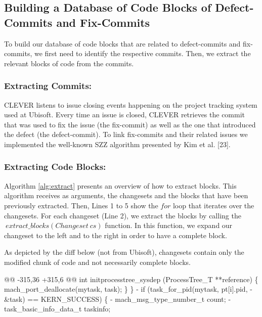\documentclass[sigconf]{acmart}
\newenvironment{Shaded}{}{}
\newcommand{\DataTypeTok}[1]{\textcolor[rgb]{0.56,0.13,0.00}{{#1}}}
\newcommand{\StringTok}[1]{\textcolor[rgb]{0.25,0.44,0.63}{{#1}}}
\newcommand{\NormalTok}[1]{{#1}}
\begin{document}
\subsection{Building a Database of Code Blocks of Defect-Commits and
Fix-Commits}\label{sec:offline}

To build our database of code blocks that are related to defect-commits
and fix-commits, we first need to identify the respective commits. Then,
we extract the relevant blocks of code from the commits.

\subsubsection{Extracting Commits:}\label{extracting-commits}

CLEVER listens to issue closing events happening on the project tracking
system used at Ubisoft. Every time an issue is closed, CLEVER retrieves
the commit that was used to fix the issue (the fix-commit) as well as
the one that introduced the defect (the defect-commit). To link
fix-commits and their related issues we implemented the well-known SZZ
algorithm presented by Kim et al. [23].

\subsubsection{Extracting Code Blocks:}\label{extracting-code-blocks}

Algorithm \ref{alg:extract} presents an overview of how to extract
blocks. This algorithm receives as arguments, the changesets and the
blocks that have been previously extracted. Then, Lines 1 to 5 show the
\(for\) loop that iterates over the changesets. For each changeset (Line
2), we extract the blocks by calling the
\(~extract\_blocks(Changeset~cs)\) function. In this function, we expand
our changeset to the left and to the right in order to have a complete
block.

As depicted by the diff below (not from Ubisoft), changesets contain
only the modified chunk of code and not necessarily complete blocks.

\begin{Shaded}
\begin{Highlighting}[]
\DataTypeTok{@@ -315,36 +315,6 @@}
\NormalTok{int initprocesstree_sysdep}
\NormalTok{(ProcessTree_T **reference) \{}
    \NormalTok{mach_port_deallocate(mytask,}
      \NormalTok{task);}
\NormalTok{\}}
\NormalTok{\}}
\StringTok{- if (task_for_pid(mytask, pt[i].pid,}
\StringTok{-  &task) == KERN_SUCCESS) \{}
\StringTok{-   mach_msg_type_number_t   count;}
\StringTok{-   task_basic_info_data_t   taskinfo;}
\end{Highlighting}
\end{Shaded}
\end{document}
